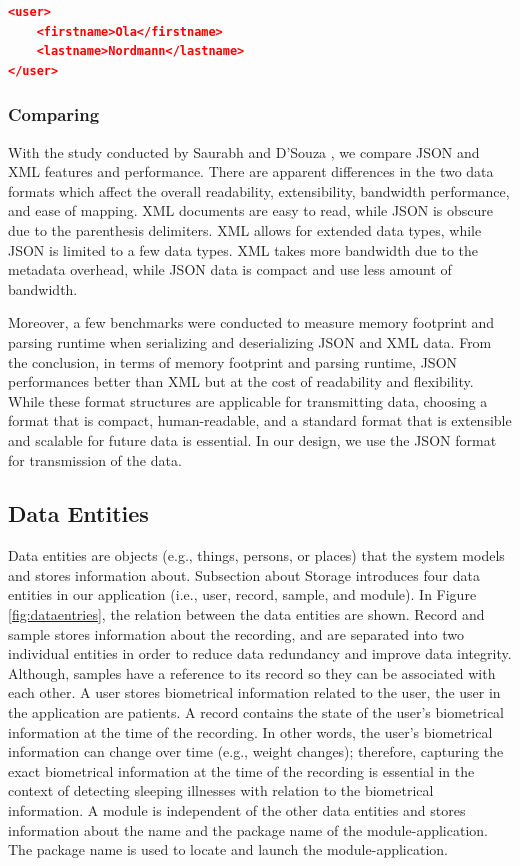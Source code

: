 \begin{lstlisting}[language=json, caption={My Caption}, captionpos=b]
<user>
    <firstname>Ola</firstname>
    <lastname>Nordmann</lastname>
</user>
\end{lstlisting}

\subsubsection{Comparing}
With the study conducted by Saurabh and D’Souza \cite{jsonvxml}, we compare JSON and XML features and performance. There are apparent differences in the two data formats which affect the overall readability, extensibility, bandwidth performance, and ease of mapping. XML documents are easy to read, while JSON is obscure due to the parenthesis delimiters. XML allows for extended data types, while JSON is limited to a few data types. XML takes more bandwidth due to the metadata overhead, while JSON data is compact and use less amount of bandwidth.

Moreover, a few benchmarks were conducted to measure memory footprint and parsing runtime when serializing and deserializing JSON and XML data. From the conclusion,  in terms of memory footprint and parsing runtime, JSON performances better than XML but at the cost of readability and flexibility. While these format structures are applicable for transmitting data, choosing a format that is compact, human-readable, and a standard format that is extensible and scalable for future data is essential. In our design, we use the JSON format for transmission of the data.

\subsection{Data Entities}
Data entities are objects (e.g., things, persons, or places) that the system models and stores information about. Subsection about Storage introduces four data entities in our application (i.e., user, record, sample, and module). In Figure \ref{fig:dataentries}, the relation between the data entities are shown. Record and sample stores information about the recording, and are separated into two individual entities in order to reduce data redundancy and improve data integrity. Although, samples have a reference to its record so they can be associated with each other. A user stores biometrical information related to the user, the user in the application are patients. A record contains the state of the user's biometrical information at the time of the recording. In other words, the user's biometrical information can change over time (e.g.,  weight changes); therefore, capturing the exact biometrical information at the time of the recording is essential in the context of detecting sleeping illnesses with relation to the biometrical information.  A module is independent of the other data entities and stores information about the name and the package name of the module-application. The package name is used to locate and launch the module-application. 


